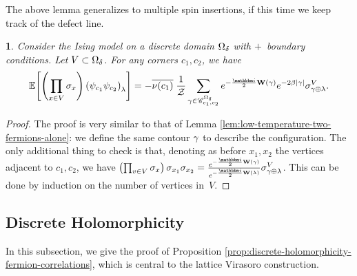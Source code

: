 \documentclass[12pt,oneside,english]{amsart}
\numberwithin{equation}{section}
\numberwithin{figure}{section}
\theoremstyle{plain}
\theoremstyle{plain}
\theoremstyle{plain}
\theoremstyle{plain}
\newtheorem{lem}[thm]{\protect\lemmaname}
\theoremstyle{remark}
\theoremstyle{definition}
\theoremstyle{plain}
\theoremstyle{plain}
\numberwithin{thm}{section}
\providecommand{\lemmaname}{Lemma}
\providecommand{\lemmaname}{Lemma}
\providecommand{\lemmaname}{Lemma}
\providecommand{\lemmaname}{Lemma}
\begin{document}
The above lemma generalizes to multiple spin insertions, if this time
we keep track of the defect line.
\begin{lem}
\label{lem:low-temperature-two-fermions-and-spins}Consider the Ising
model on a discrete domain ${{\Omega}}_{{\delta}} $ with $+$~boundary conditions.
Let $V\subset{{\Omega}}_{{\delta}} $. For any corners $c_{1},c_{2}$,
we have 
\begin{equation}
\correl{ \left(\prod_{x\in V}
  \spin_{x}\right) \left(\ferm_{c_{1}} 
    \ferm_{c_{2}}\right)_{\lambda} }
= - \overline{\corndir (c_{1})} \; \frac{1}{\mathcal{Z}}
  \sum_{\LTEishelem \in \LTEsetptsin{c_{1},c_{2}}{\ddomain}}
    e^{-\frac{\ii}{2}\mathbf{W}\left(\LTEishelem\right)}
    e^{-2\invtemp\left|\LTEishelem\right|}\spin_{\LTEishelem\oplus\lambda}^{V} .
\label{eq:low-temperature-exp-two-fermion-n-spin}
\end{equation}
\end{lem}
\begin{proof}
The proof is very similar to that of Lemma 
\ref{lem:low-temperature-two-fermions-alone}:
we define the same contour ${\gamma}$ to describe the configuration.
The only additional thing to check is that, denoting as before $x_{1},x_{2}$
the vertices adjacent to $c_{1},c_{2}$, we have 
$\left(\prod_{v\in V}
  \spin_{x}\right) \spin_{x_{1}} \spin_{x_{2}}
= \frac{e^{-\frac{\ii}{2}
  \mathbf{W} 
    \left(\LTEishelem\right)}}{%
      e^{-\frac{\ii}{2}\mathbf{W}\left(\lambda\right)}}
\spin_{\LTEishelem\oplus\lambda}^{V}$.
This can be done by induction on the number of vertices in~$V$. 
\end{proof}



\subsection{\label{subsec:discrete-holomorphicity} Discrete Holomorphicity}

In this subsection, we give the proof of Proposition 
\ref{prop:discrete-holomorphicity-fermion-correlations},
which is central to the lattice Virasoro construction.
\end{document}
